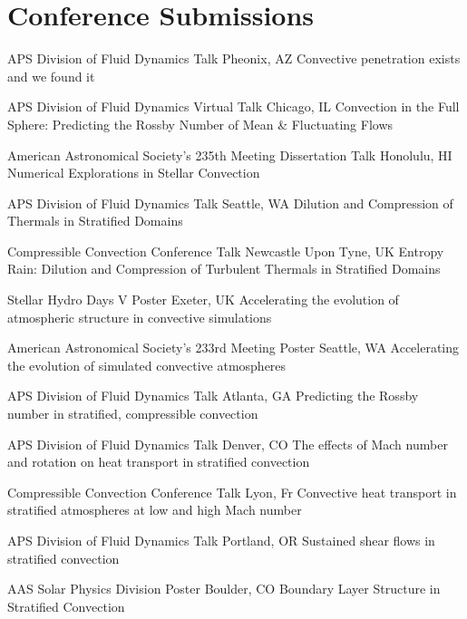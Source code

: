 \section{Conference Submissions}

		{APS Division of Fluid Dynamics}
		{Talk}
		{Pheonix, AZ}
		{}
		{Convective penetration exists and we found it}

		{APS Division of Fluid Dynamics}
		{Virtual Talk}
		{Chicago, IL}
		{}
		{Convection in the Full Sphere: Predicting the Rossby Number of Mean \& Fluctuating Flows}


\cventry{}
		{American Astronomical Society's 235th Meeting}
		{Dissertation Talk}
		{Honolulu, HI}
		{}
		{Numerical Explorations in Stellar Convection}

		{APS Division of Fluid Dynamics}
		{Talk}
		{Seattle, WA}
		{}
		{Dilution and Compression of Thermals in Stratified Domains}

\cventry{}
		{Compressible Convection Conference}
		{Talk}
		{Newcastle Upon Tyne, UK}
		{}
		{Entropy Rain: Dilution and Compression of Turbulent Thermals in Stratified Domains}

\cventry{}
		{Stellar Hydro Days V}
		{Poster}
		{Exeter, UK}
		{}
		{Accelerating the evolution of atmospheric structure in convective simulations}

\cventry{}
		{American Astronomical Society's 233rd Meeting}
		{Poster}
		{Seattle, WA}
		{}
		{Accelerating the evolution of simulated convective atmospheres}

		{APS Division of Fluid Dynamics}
		{Talk}
		{Atlanta, GA}
		{}
		{Predicting the Rossby number in stratified, compressible convection}

		{APS Division of Fluid Dynamics}
		{Talk}
		{Denver, CO}
		{}
		{The effects of Mach number and rotation on heat transport in stratified convection}

\cventry{}
		{Compressible Convection Conference}
		{Talk}
		{Lyon, Fr}
		{}
		{Convective heat transport in stratified atmospheres at low and high Mach number}

		{APS Division of Fluid Dynamics}
		{Talk}
		{Portland, OR}
		{}
		{Sustained shear flows in stratified convection}

\cventry{}
		{AAS Solar Physics Division}
		{Poster}
		{Boulder, CO}
		{}
		{Boundary Layer Structure in Stratified Convection}

